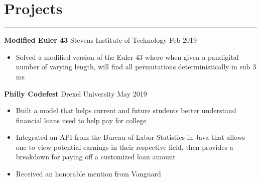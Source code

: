 \documentclass[10pt]{article}
\newcommand{\resumesection}[1]{\vspace{-0.2cm}\section*{#1}\vspace{-0.2cm}\hrule\vspace{0.2cm}}
\begin{document}
%

\resumesection{Projects}
\textbf{Modified Euler 43} Stevens Institute of Technology \hfill Feb 2019\par
\begin{itemize}
	\item Solved a modified version of the Euler 43 where when given a pandigital number of varying length, will find all permutations deterministically in sub 3 ms
\end{itemize}

\textbf{Philly Codefest} Drexel University \hfill May 2019\par
\begin{itemize}
	\item Built a model that helps current and future students better understand financial loans used to help pay for college
	\item Integrated an API from the Bureau of Labor Statistics in Java that allows one to view potential earnings in their respective field, then provides a breakdown for paying off a customized loan amount
	\item Received an honorable mention from Vanguard
\end{itemize}
\end{document}
